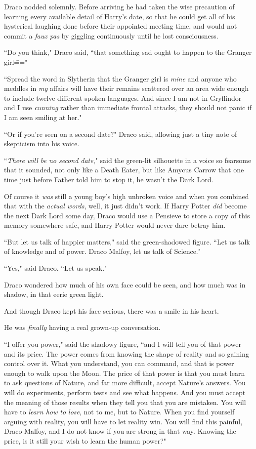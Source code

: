 Draco nodded solemnly. Before arriving he had taken the wise precaution of learning every available detail of Harry's date, so that he could get all of his hysterical laughing done before their appointed meeting time, and would not commit a \emph{faux pas} by giggling continuously until he lost consciousness.

``Do you think," Draco said, ``that something sad ought to happen to the Granger girl\==="

``Spread the word in Slytherin that the Granger girl is \emph{mine} and anyone who meddles in \emph{my} affairs will have their remains scattered over an area wide enough to include twelve different spoken languages. And since I am not in Gryffindor and I use \emph{cunning} rather than immediate frontal attacks, they should not panic if I am seen smiling at her."

``Or if you're seen on a second date?" Draco said, allowing just a tiny note of skepticism into his voice.

``\emph{There will be no second date}," said the green-lit silhouette in a voice so fearsome that it sounded, not only like a Death Eater, but like Amycus Carrow that one time just before Father told him to stop it, he wasn't the Dark Lord.

Of course it \emph{was} still a young boy's high unbroken voice and when you combined that with the \emph{actual words}, well, it just didn't work. If Harry Potter \emph{did} become the next Dark Lord some day, Draco would use a Pensieve to store a copy of this memory somewhere safe, and Harry Potter would never dare betray him.

``But let us talk of happier matters," said the green-shadowed figure. ``Let us talk of knowledge and of power. Draco Malfoy, let us talk of Science."

``Yes," said Draco. ``Let us speak."

Draco wondered how much of his own face could be seen, and how much was in shadow, in that eerie green light.

And though Draco kept his face serious, there was a smile in his heart.

He was \emph{finally} having a real grown-up conversation.

``I offer you power," said the shadowy figure, ``and I will tell you of that power and its price. The power comes from knowing the shape of reality and so gaining control over it. What you understand, you can command, and that is power enough to walk upon the Moon. The price of that power is that you must learn to ask questions of Nature, and far more difficult, accept Nature's answers. You will do experiments, perform tests and see what happens. And you must accept the meaning of those results when they tell you that you are mistaken. You will have to \emph{learn how to lose}, not to me, but to Nature. When you find yourself arguing with reality, you will have to let reality win. You will find this painful, Draco Malfoy, and I do not know if you are strong in that way. Knowing the price, is it still your wish to learn the human power?"

